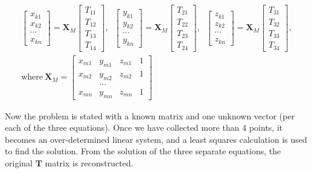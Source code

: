 \begin{gather*}
    \begin{bmatrix}
        x_{k1} \\
        x_{k2} \\
        \cdots \\
        x_{kn}
    \end{bmatrix}
    =
    \mathbf{X}_M
    \begin{bmatrix}
        T_{11} \\
        T_{12} \\
        T_{13} \\
        T_{14}
    \end{bmatrix}
    ,\;\;
    \begin{bmatrix}
        y_{k1} \\
        y_{k2} \\
        \cdots \\
        y_{kn}
    \end{bmatrix}
    =
    \mathbf{X}_M
    \begin{bmatrix}
        T_{21} \\
        T_{22} \\
        T_{23} \\
        T_{24}
    \end{bmatrix}
    ,\;\;
    \begin{bmatrix}
        z_{k1} \\
        z_{k2} \\
        \cdots \\
        z_{kn}
    \end{bmatrix}
    =
    \mathbf{X}_M
    \begin{bmatrix}
        T_{31} \\
        T_{32} \\
        T_{33} \\
        T_{34}
    \end{bmatrix}
    ,\\
    \text{where}~\mathbf{X}_M =
    \begin{bmatrix}
        x_{m1} & y_{m1} & z_{m1} & 1 \\
        x_{m2} & y_{m2} & z_{m2} & 1 \\
        &\dots & & \\
        x_{mn} & y_{mn} & z_{mn} & 1
    \end{bmatrix}
\end{gather*}

Now the problem is stated with a known matrix and one unknown vector (per each of the three equations).
Once we have collected more than 4 points, it becomes an over-determined linear system, and a least squares calculation is used to find the solution.
From the solution of the three separate equations, the original $\mathbf{T}$ matrix is reconstructed.

